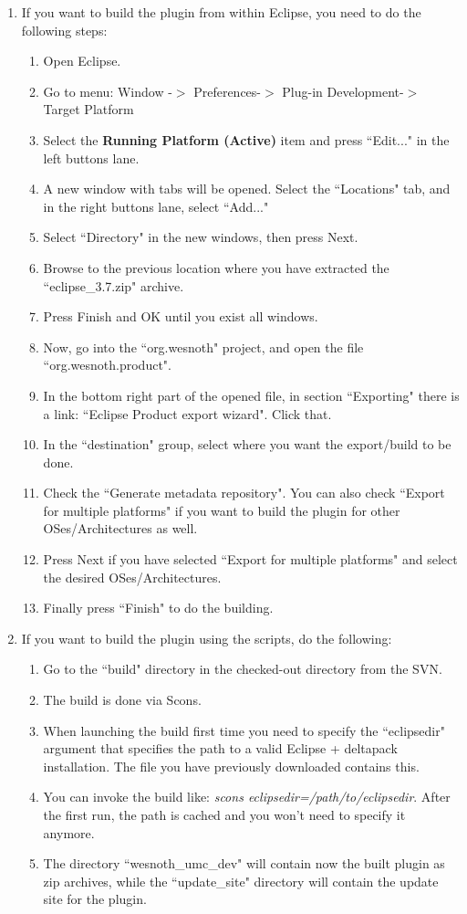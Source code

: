 \documentclass[10pt]{article}
\begin{document}
\begin{enumerate}
  \item If you want to build the plugin from within Eclipse, you need to do the following steps:
  \begin{enumerate}
    \item Open Eclipse.
    \item Go to menu: Window -$>$ Preferences-$>$ Plug-in Development-$>$ Target Platform
    \item Select the \textbf{Running Platform (Active)} item and press ``Edit..." in the left buttons lane.
    \item A new window with tabs will be opened. Select the ``Locations" tab, and in the right buttons lane, select ``Add..."
    \item Select ``Directory" in the new windows, then press Next.
    \item Browse to the previous location where you have extracted the ``eclipse\_3.7.zip" archive.
    \item Press Finish and OK until you exist all windows.
    \item Now, go into the ``org.wesnoth" project, and open the file ``org.wesnoth.product".
    \item In the bottom right part of the opened file, in section ``Exporting" there is a link: ``Eclipse Product export wizard". Click that.
    \item In the ``destination" group, select where you want the export/build to be done.
    \item Check the ``Generate metadata repository". You can also check ``Export for multiple platforms" if you want to build the plugin for other OSes/Architectures as well.
    \item Press Next if you have selected ``Export for multiple platforms" and select the desired OSes/Architectures.
    \item Finally press ``Finish" to do the building.
  \end{enumerate}

  \item If you want to build the plugin using the scripts, do the following:
  \begin{enumerate}
    \item Go to the ``build" directory in the checked-out directory from the SVN.
    \item The build is done via Scons.
    \item When launching the build first time you need to specify the ``eclipsedir" argument that specifies the path to a valid Eclipse + deltapack installation. The file you have previously downloaded contains this.
    \item You can invoke the build like: \textit{scons  eclipsedir=/path/to/eclipsedir}. After the first run, the path is cached and you won't need to specify it anymore.
    \item The directory ``wesnoth\_umc\_dev" will contain now the built plugin as zip archives, while the ``update\_site" directory will contain the update site for the plugin.
  \end{enumerate}
\end{enumerate}
\end{document}
